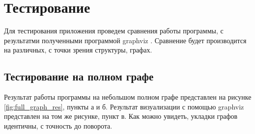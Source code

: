 \documentclass[14pt, russian]{scrartcl}
\begin{document}
\section{Тестирование}

Для тестирования приложения проведем сравнения работы программы, с результатми полученными программой graphviz \cite{GV}. Сравнение будет производится на различных, с точки зрения структуры, графах.

\subsection{Тестирование на полном графе}

Результат работы программы на небольшом полном графе представлен на рисунке \ref{fig:full_graph_res}, пункты а и б. Результат визуализации с помощью graphviz представлен на том же рисунке, пункт в. Как можно увидеть, укладки графов идентичны, с точность до поворота.
\end{document}
